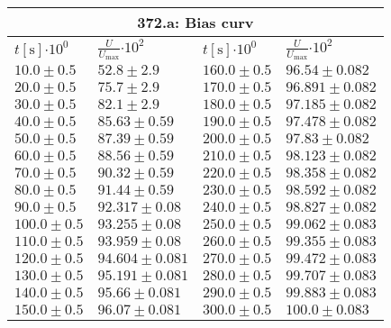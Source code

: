 \documentclass{article}
\begin{document}
\begin{tabular}{|p{3cm}|p{3cm}||p{3cm}|p{3cm}|}
\hline
\multicolumn{4}{|c|}{372.a: Bias curv}\\
\hline
$t[\textrm{s}]$$\cdot 10^{0}$&$\frac{U}{U_{\textrm{max}}}$$\cdot 10^{2}$&$t[\textrm{s}]$$\cdot 10^{0}$&$\frac{U}{U_{\textrm{max}}}$$\cdot 10^{2}$\\
\hline
$10.0\pm0.5$&$52.8\pm 2.9$&$160.0\pm0.5$&$96.54\pm 0.082$\\
$20.0\pm0.5$&$75.7\pm 2.9$&$170.0\pm0.5$&$96.891\pm 0.082$\\
$30.0\pm0.5$&$82.1\pm 2.9$&$180.0\pm0.5$&$97.185\pm 0.082$\\
$40.0\pm0.5$&$85.63\pm 0.59$&$190.0\pm0.5$&$97.478\pm 0.082$\\
$50.0\pm0.5$&$87.39\pm 0.59$&$200.0\pm0.5$&$97.83\pm 0.082$\\
$60.0\pm0.5$&$88.56\pm 0.59$&$210.0\pm0.5$&$98.123\pm 0.082$\\
$70.0\pm0.5$&$90.32\pm 0.59$&$220.0\pm0.5$&$98.358\pm 0.082$\\
$80.0\pm0.5$&$91.44\pm 0.59$&$230.0\pm0.5$&$98.592\pm 0.082$\\
$90.0\pm0.5$&$92.317\pm 0.08$&$240.0\pm0.5$&$98.827\pm 0.082$\\
$100.0\pm0.5$&$93.255\pm 0.08$&$250.0\pm0.5$&$99.062\pm 0.083$\\
$110.0\pm0.5$&$93.959\pm 0.08$&$260.0\pm0.5$&$99.355\pm 0.083$\\
$120.0\pm0.5$&$94.604\pm 0.081$&$270.0\pm0.5$&$99.472\pm 0.083$\\
$130.0\pm0.5$&$95.191\pm 0.081$&$280.0\pm0.5$&$99.707\pm 0.083$\\
$140.0\pm0.5$&$95.66\pm 0.081$&$290.0\pm0.5$&$99.883\pm 0.083$\\
$150.0\pm0.5$&$96.07\pm 0.081$&$300.0\pm0.5$&$100.0\pm 0.083$\\
\hline
\end{tabular}
\end{document}
